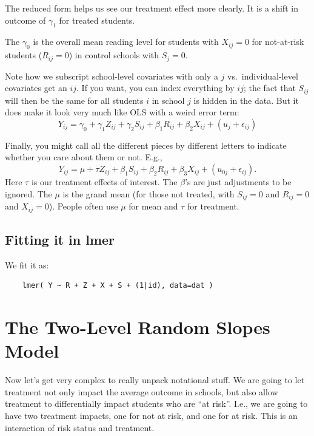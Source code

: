 \documentclass[
  letterpaper,
  DIV=11,
  numbers=noendperiod]{scrreprt}
\begin{document}
The reduced form helps us see our treatment effect more clearly. It is a
shift in outcome of \(\gamma_1\) for treated students.

The \(\gamma_{0}\) is the overall mean reading level for students with
\(X_{ij}=0\) for not-at-risk students (\(R_{ij}=0\)) in control schools
with \(S_j = 0\).

Note how we subscript school-level covariates with only a \(j\)
vs.~individual-level covariates get an \(ij\). If you want, you can
index everything by \(ij\); the fact that \(S_{ij}\) will then be the
same for all students \(i\) in school \(j\) is hidden in the data. But
it does make it look very much like OLS with a weird error term: \[
Y_{ij} = \gamma_{0} + \gamma_{1} Z_{ij} + \gamma_{2} S_{ij} + \beta_{1} R_{ij} + \beta_{2} X_{ij} + (u_{j} + \epsilon_{ij})
\]

Finally, you might call all the different pieces by different letters to
indicate whether you care about them or not. E.g.,
\[Y_{ij} = \mu + \tau Z_{ij}  + \beta_1 S_{ij} + \beta_2 R_{ij} + \beta_3 X_{ij} + (u_{0j} +  \epsilon_{ij}) .\]
Here \(\tau\) is our treatment effects of interest. The \(\beta\)'s are
just adjustments to be ignored. The \(\mu\) is the grand mean (for those
not treated, with \(S_{ij} = 0\) and \(R_{ij} = 0\) and \(X_{ij} = 0\)).
People often use \(\mu\) for mean and \(\tau\) for treatment.

\hypertarget{fitting-it-in-lmer}{%
\subsection{Fitting it in lmer}\label{fitting-it-in-lmer}}

We fit it as:

\begin{verbatim}
    lmer( Y ~ R + Z + X + S + (1|id), data=dat )
\end{verbatim}

\hypertarget{the-two-level-random-slopes-model}{%
\section{The Two-Level Random Slopes
Model}\label{the-two-level-random-slopes-model}}

Now let's get very complex to really unpack notational stuff. We are
going to let treatment not only impact the average outcome in schools,
but also allow treatment to differentially impact students who are ``at
risk''. I.e., we are going to have two treatment impacts, one for not at
risk, and one for at risk. This is an interaction of risk status and
treatment.
\end{document}
